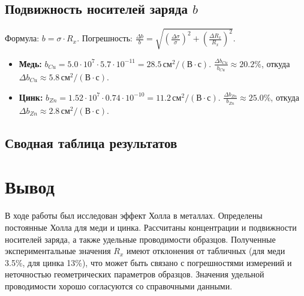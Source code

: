 \documentclass[a4paper,10pt]{article}
\begin{document}
\subsection*{Подвижность носителей заряда \(b\)}
Формула: \(b = \sigma \cdot R_x\). 
Погрешность: \(\frac{\Delta b}{b} = \sqrt{(\frac{\Delta \sigma}{\sigma})^2 + (\frac{\Delta R_x}{R_x})^2}\).
\begin{itemize}
    \item \textbf{Медь:} \(b_{Cu} = 5.0 \cdot 10^7 \cdot 5.7 \cdot 10^{-11} = 28.5 \, \text{см}^2/(\text{В}\cdot\text{с})\). 
    \(\frac{\Delta b_{Cu}}{b_{Cu}} \approx 20.2\%\), откуда \(\Delta b_{Cu} \approx 5.8 \, \text{см}^2/(\text{В}\cdot\text{с})\).
    \item \textbf{Цинк:} \(b_{Zn} = 1.52 \cdot 10^7 \cdot 0.74 \cdot 10^{-10} = 11.2 \, \text{см}^2/(\text{В}\cdot\text{с})\). 
    \(\frac{\Delta b_{Zn}}{b_{Zn}} \approx 25.0\%\), откуда \(\Delta b_{Zn} \approx 2.8 \, \text{см}^2/(\text{В}\cdot\text{с})\).
\end{itemize}

\subsection*{Сводная таблица результатов}
\begin{center}
\end{center}

\section*{Вывод}
В ходе работы был исследован эффект Холла в металлах. Определены постоянные Холла для меди и цинка. Рассчитаны концентрации и подвижности носителей заряда, а также удельные проводимости образцов. Полученные экспериментальные значения \(R_x\) имеют отклонения от табличных (для меди 3.5\%, для цинка 13\%), что может быть связано с погрешностями измерений и неточностью геометрических параметров образцов. Значения удельной проводимости хорошо согласуются со справочными данными.
\end{document}

